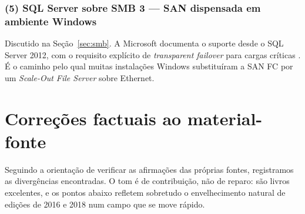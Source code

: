 \documentclass[11pt,a4paper]{article}
\begin{document}
\subsubsection*{(5) SQL Server sobre SMB 3 --- SAN dispensada em ambiente Windows}

Discutido na Seção~\ref{sec:smb}. A Microsoft documenta o suporte desde o SQL Server 2012, com o
requisito explícito de \textit{transparent failover} para cargas críticas \cite{mssqlsmb}. É o
caminho pelo qual muitas instalações Windows substituíram a SAN FC por um \textit{Scale-Out File
Server} sobre Ethernet.

\section{Correções factuais ao material-fonte}
\label{sec:correcoes}

Seguindo a orientação de verificar as afirmações das próprias fontes, registramos as divergências
encontradas. O tom é de contribuição, não de reparo: são livros excelentes, e os pontos abaixo
refletem sobretudo o envelhecimento natural de edições de 2016 e 2018 num campo que se move rápido.
\end{document}
